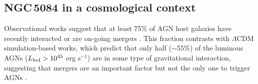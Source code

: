 \documentclass[modern]{aastex631}
\begin{document}

\subsection{NGC\,5084 in a cosmological context}
\label{subsec:origin_of_NGC5084}

Observational works suggest that at least 75\% of AGN host galaxies have recently interacted or are on-going mergers \citep{keel+2012mnras420_878}. This fraction contrasts with $\Lambda$CDM simulation-based works, which predict that only half ($\sim$55\%) of the luminous AGNs ($L_{\rm bol} > 10^{45}$ erg s$^{-1}$) are in some type of gravitational interaction, suggesting that mergers are an important factor but not the only one to trigger AGNs \citep{byrnemamahit+2024arXiv2402.05196}.
\end{document}
